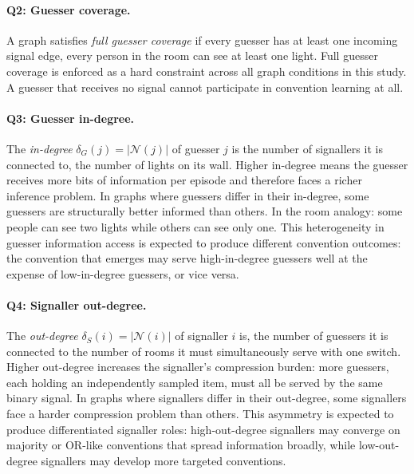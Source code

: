 \documentclass[a4paper,twoside,12pt]{report}
\begin{document}
    \paragraph{Q2: Guesser coverage.}
    A graph satisfies \emph{full guesser coverage} if every guesser has at least
    one incoming signal edge, every person in the room can see at least one
    light. Full guesser coverage is enforced as a hard constraint across all graph
    conditions in this study. A guesser that receives no signal cannot participate
    in convention learning at all.
    
    \paragraph{Q3: Guesser in-degree.}
    The \emph{in-degree} $\delta_G(j) = |\mathcal{N}(j)|$ of guesser $j$ is the
    number of signallers it is connected to, the number of lights on its wall.
    Higher in-degree means the guesser receives more bits of information per
    episode and therefore faces a richer inference problem. In graphs where
    guessers differ in their in-degree, some guessers are structurally better
    informed than others. In the room analogy: some people can see two lights while
    others can see only one. This heterogeneity in guesser information access is
    expected to produce different convention outcomes: the convention that emerges
    may serve high-in-degree guessers well at the expense of low-in-degree guessers,
    or vice versa.
    
    \paragraph{Q4: Signaller out-degree.}
    The \emph{out-degree} $\delta_S(i) = |\mathcal{N}(i)|$ of signaller $i$ is, the number of guessers it is connected to  the number of rooms it must
    simultaneously serve with one switch. Higher out-degree increases the signaller's
    compression burden: more guessers, each holding an independently sampled item,
    must all be served by the same binary signal. In graphs where signallers differ
    in their out-degree, some signallers face a harder compression problem than
    others. This asymmetry is expected to produce differentiated signaller roles:
    high-out-degree signallers may converge on majority or OR-like conventions that
    spread information broadly, while low-out-degree signallers may develop more
    targeted conventions.
    
\end{document}
